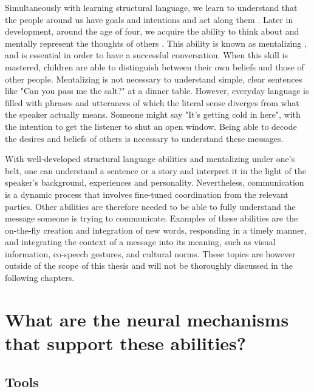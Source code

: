 Simultaneously with learning structural language, we learn to understand that the people around us have goals and intentions and act along them \citep{gergely2002,tomasello2003}. Later in development, around the age of four, we acquire the ability to think about and mentally represent the thoughts of others \citep{wimmer1983}. This ability is known as mentalizing \citep{premack1978}, and is essential in order to have a successful conversation. When this skill is mastered, children are able to distinguish between their own beliefs and those of other people. Mentalizing is not necessary to understand simple, clear sentences like "Can you pass me the salt?" at a dinner table. However, everyday language is filled with phrases and utterances of which the literal sense diverges from what the speaker actually means. Someone might say "It's getting cold in here", with the intention to get the listener to shut an open window. Being able to decode the desires and beliefs of others is necessary to understand these messages.

With well-developed structural language abilities and mentalizing under one's belt, one can understand a sentence or a story and interpret it in the light of the speaker's background, experiences and personality. Nevertheless, communication is a dynamic process that involves fine-tuned coordination from the relevant parties. Other abilities are therefore needed to be able to fully understand the message someone is trying to communicate. Examples of these abilities are the on-the-fly creation and integration of new words, responding in a timely manner, and integrating the context of a message into its meaning, such as visual information, co-speech gestures, and cultural norms. These topics are however outside of the scope of this thesis and will not be thoroughly discussed in the following chapters.
 
\section*{What are the neural mechanisms that support these abilities?}

\subsection*{Tools}

